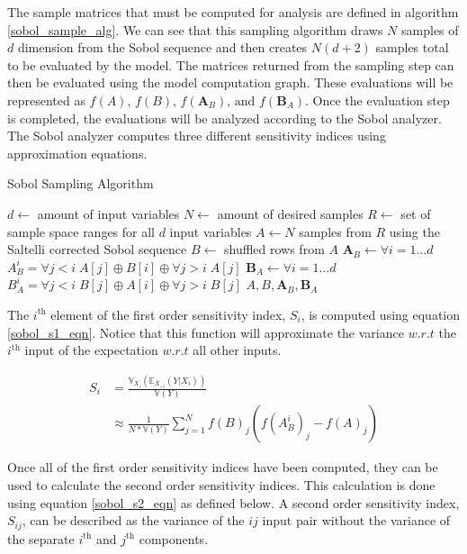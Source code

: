 The sample matrices that must be computed for analysis are defined in algorithm \ref{sobol_sample_alg}. We can see that this sampling algorithm draws $N$ samples of $d$ dimension from the Sobol sequence and then creates $N(d+2)$ samples total to be evaluated by the model. The matrices returned from the sampling step can then be evaluated using the model computation graph. These evaluations will be represented as $f(A) \text{, } f(B) \text{, } f(\textbf{A}_{B}) \text{, and } f(\textbf{B}_{A})$. Once the evaluation step is completed, the evaluations will be analyzed according to the Sobol analyzer. The Sobol analyzer computes three different sensitivity indices using approximation equations.

\begin{algorithm}
  \caption{Sobol Sampling Algorithm}
  \label{sobol_sample_alg}
  \begin{algorithmic}[1]
    \Require $d \gets $ amount of input variables
    \Require $N \gets $ amount of desired samples
    \Require $R \gets $ set of sample space ranges for all $d$ input variables
    \State $A \gets N$ samples from $R$ using the Saltelli corrected Sobol sequence
    \State $B \gets $ shuffled rows from $A$
    \State $\textbf{A}_{B} \gets \forall i = 1 \ldots d$ $A_{B}^i = \forall j < i \; A[j] \oplus B[i] \oplus \forall j > i \; A[j]$
    \State $\textbf{B}_{A} \gets \forall i = 1 \ldots d$ $B_{A}^i = \forall j < i \; B[j] \oplus A[i] \oplus \forall j > i \; B[j]$
    \State \Return $A, B, \textbf{A}_{B}, \textbf{B}_{A}$
  \end{algorithmic}
\end{algorithm}

The $i^{\text{th}}$ element of the first order sensitivity index, $S_i$, is computed using equation \ref{sobol_s1_eqn}. Notice that this function will approximate the variance $w.r.t$ the $i^{\text{th}}$ input of the expectation $w.r.t$ all other inputs.

\begin{equation} \label{sobol_s1_eqn}
  \begin{split}
    S_i & = \frac{\mathbb{V}_{X_i}(\mathbb{E}_{X_{\sim i}}(Y | X_i))}{\mathbb{V}(Y)} \\
     & \approx \frac{1}{N * \mathbb{V}(Y)} \sum_{j=1}^{N} f(B)_j (f(A_{B}^{i})_j - f(A)_j)
  \end{split}
\end{equation}

Once all of the first order sensitivity indices have been computed, they can be used to calculate the second order sensitivity indices. This calculation is done using equation \ref{sobol_s2_eqn} as defined below. A second order sensitivity index, $S_{ij}$, can be described as the variance of the $ij$ input pair without the variance of the separate $i^{\text{th}}$ and $j^{\text{th}}$ components.

